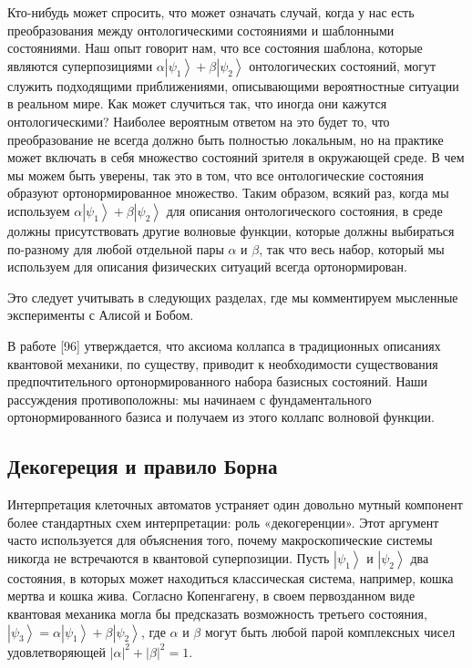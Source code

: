 \documentclass[main.tex]{subfiles}
\begin{document}
Кто-нибудь может спросить, что может означать случай, когда у нас есть преобразования между онтологическими состояниями и шаблонными состояниями. Наш опыт говорит нам, что все состояния шаблона, которые являются суперпозициями $\alpha\left|\psi_1\right> + \beta\left|\psi_2\right>$ онтологических состояний, могут служить подходящими приближениями, описывающими вероятностные ситуации в реальном мире. Как может случиться так, что иногда они кажутся онтологическими? Наиболее вероятным ответом на это будет то, что преобразование не всегда должно быть полностью локальным, но на практике может включать в себя множество состояний зрителя в окружающей среде. В чем мы можем быть уверены, так это в том, что все онтологические состояния образуют ортонормированное множество. Таким образом, всякий раз, когда мы используем $\alpha\left|\psi_1\right> + \beta\left|\psi_2\right>$ для описания онтологического состояния, в среде должны присутствовать другие волновые функции, которые должны выбираться по-разному для любой отдельной пары $\alpha$ и $\beta$, так что весь набор, который мы используем для описания физических ситуаций всегда ортонормирован.

Это следует учитывать в следующих разделах, где мы комментируем мысленные эксперименты с Алисой и Бобом.

В работе [96] утверждается, что аксиома коллапса в традиционных описаниях квантовой механики, по существу, приводит к необходимости существования предпочтительного ортонормированного набора базисных состояний. Наши рассуждения противоположны: мы начинаем с фундаментального ортонормированного базиса и получаем из этого коллапс волновой функции.

\subsection{Декогереция и правило Борна}\label{ch3.5}

Интерпретация клеточных автоматов устраняет один довольно мутный компонент более стандартных схем интерпретации: роль «декогеренции». Этот аргумент часто используется для объяснения того, почему макроскопические системы никогда не встречаются в квантовой суперпозиции. Пусть $\left|\psi_1\right>$ и $\left|\psi_2\right>$ два состояния, в которых может находиться классическая система, например, кошка мертва и кошка жива. Согласно Копенгагену, в своем первозданном виде квантовая механика могла бы предсказать возможность третьего состояния, $\left|\psi_3\right> = \alpha\left|\psi_1\right> + \beta\left|\psi_2\right>$, где $\alpha$ и $\beta$ могут быть любой парой комплексных чисел удовлетворяющей $|\alpha|^2 +  |\beta|^2 = 1$.
\end{document}
